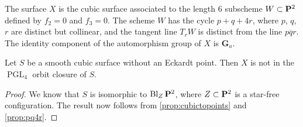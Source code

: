 \documentclass[reqno]{amsart}
\DeclareMathOperator{\Bl}{Bl}
\renewcommand {\P}{{\bf P}}
\providecommand{\PGL}{\operatorname{PGL}}
\numberwithin{equation}{section}
\newcommand{\G}{\mathbf{G}}
\begin{document}
The surface $X$ is the cubic surface associated to the length 6 subscheme $W \subset \P^2$ defined by $f_2 = 0$ and $f_3 = 0$.
The scheme $W$ has the cycle $p + q + 4r$, where $p$, $q$, $r$ are distinct but collinear, and the tangent line $T_rW$ is distinct from the line $\overline{pqr}$.
The identity component of the automorphism group of $X$ is $\G_a$.
\begin{proposition}
  Let $S$ be a smooth cubic surface without an Eckardt point.
  Then $X$ is not in the $\PGL_4$ orbit closure of $S$.
\end{proposition}
\begin{proof}
  We know that $S$ is isomorphic to $\Bl_Z \P^2$, where $Z \subset \P^2$ is a star-free configuration.
  The result now follows from \autoref{prop:cubictopoints} and \autoref{prop:pq4r}.
\end{proof}
\end{document}
